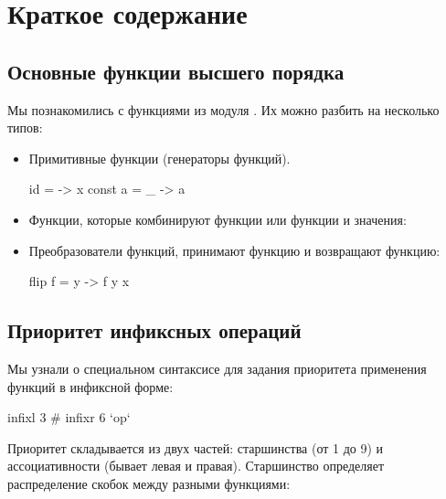 \section{Краткое содержание}


\subsection*{Основные функции высшего порядка}

Мы познакомились с функциями из модуля .
Их можно разбить на несколько типов:

\begin{itemize}

\item Примитивные функции (генераторы функций). 
        
\begin{code}
id      = \x -> x
const a = \_ -> a
\end{code}

\item Функции, которые комбинируют функции или функции и значения:
        
        
\item Преобразователи функций, принимают функцию и возвращают функцию:

\begin{code}
flip f = \x y -> f y x
\end{code}

\end{itemize}


\subsection*{Приоритет инфиксных операций}

Мы узнали о специальном синтаксисе для задания приоритета 
применения функций в инфиксной форме:

\begin{code}
infixl 3 #
infixr 6 `op`
\end{code}

Приоритет складывается из двух частей: старшинства (от 1 до 9)
и ассоциативности (бывает левая и правая). Старшинство определяет 
распределение скобок между разными функциями:

